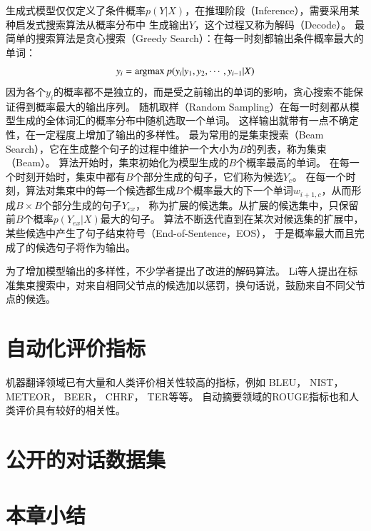 生成式模型仅仅定义了条件概率$p(Y|X)$，在推理阶段（Inference），需要采用某种启发式搜索算法从概率分布中
生成输出$Y$，这个过程又称为解码（Decode）。
最简单的搜索算法是贪心搜索（Greedy Search）：在每一时刻都输出条件概率最大的单词：
\begin{align}
    y_i = \operatorname*{argmax} p(y_i|y_1, y_2, \cdots, y_{i-1}|X)
\end{align}
因为各个$y_i$的概率都不是独立的，而是受之前输出的单词的影响，贪心搜索不能保证得到概率最大的输出序列。
随机取样（Random Sampling）在每一时刻都从模型生成的全体词汇的概率分布中随机选取一个单词。
这样输出就带有一点不确定性，在一定程度上增加了输出的多样性。
最为常用的是集束搜索（Beam Search），它在生成整个句子的过程中维护一个大小为$B$的列表，称为集束（Beam）。
算法开始时，集束初始化为模型生成的$B$个概率最高的单词。
在每一个时刻开始时，集束中都有$B$个部分生成的句子，它们称为候选$Y_c$。
在每一个时刻，算法对集束中的每一个候选都生成$B$个概率最大的下一个单词$w_{i+1, c}$，从而形成$B \times B$个部分生成的句子$Y_{ex}$，
称为扩展的候选集。从扩展的候选集中，只保留前$B$个概率$p(Y_{ex}|X)$最大的句子。
算法不断迭代直到在某次对候选集的扩展中，某些候选中产生了句子结束符号（End-of-Sentence，EOS），
于是概率最大而且完成了的候选句子将作为输出。

为了增加模型输出的多样性，不少学者提出了改进的解码算法。
Li等人提出在标准集束搜索中，对来自相同父节点的候选加以惩罚，换句话说，鼓励来自不同父节点的候选。


\section{自动化评价指标}\label{sec:automatic_metric}
机器翻译领域已有大量和人类评价相关性较高的指标，例如
BLEU，
NIST，
METEOR，
BEER，
CHRF，
TER等等。
自动摘要领域的ROUGE指标也和人类评价具有较好的相关性。


\section{公开的对话数据集}\label{sec:public_dataset}

\section{本章小结}\label{sec:rw_conclusion}
